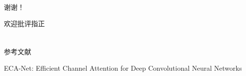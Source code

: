 \documentclass[10pt]{beamer}
\begin{document}
{
\begin{frame}[standout]
\centering
\Huge{谢谢！}
\vspace{1cm}

\Large{欢迎批评指正}
\end{frame}
}

\section*{}
\begin{frame}[allowframebreaks]{参考文献}
\begin{thebibliography}{99}
 ECA-Net: Efficient Channel Attention for Deep Convolutional Neural Networks


\end{thebibliography}
\end{frame}
\end{document}
